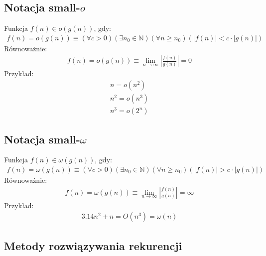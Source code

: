 \documentclass{article}
\newenvironment{definition}[1]{%
    \trivlist
    \item[\hskip\labelsep\textbf{Definition. #1.}]
    \ignorespaces
}{%
    \endtrivlist
}
\begin{document}
\subsection{Notacja small-$o$}

\begin{definition}{Notacja small-$o$}
    Funkcja $f(n)\in o(g(n))$, gdy:
    \begin{align}
        f(n) = o(g(n)) \equiv 
        \left(\forall c>0\right)
        \left(\exists n_0\in\mathbb{N}\right)
        \left(\forall n\geq n_0\right)
        \left(|f(n)| < c \cdot |g(n)|\right)
    \end{align}
    \noindent
    Równoważnie:
    \begin{align}
        f(n) = o(g(n)) \equiv \lim_{n\rightarrow \infty} \left|\frac{f(n)}{g(n)}\right| = 0
    \end{align}
    \noindent
    Przykład:
    \begin{align}
        n = o(n^2)\\
        n^2 = o(n^3)\\
        n^3 = o(2^n)
    \end{align}
\end{definition}

\subsection{Notacja small-$\omega$}

\begin{definition}{Notacja small-$\omega$}
    Funkcja $f(n)\in \omega(g(n))$, gdy:
    \begin{align}
        f(n) = \omega(g(n)) \equiv 
        \left(\forall c>0\right)
        \left(\exists n_0\in\mathbb{N}\right)
        \left(\forall n\geq n_0\right)
        \left(|f(n)| > c \cdot |g(n)|\right)
    \end{align}
    \noindent
    Równoważnie:
    \begin{align}
        f(n) = \omega(g(n)) \equiv \lim_{n\rightarrow \infty} \left|\frac{f(n)}{g(n)}\right| = \infty
    \end{align}
    \noindent
    Przykład:
    \begin{align}
        3.14n^2 + n = O(n^3) = \omega(n)
    \end{align}
\end{definition}

\subsection{Metody rozwiązywania rekurencji}
\end{document}

